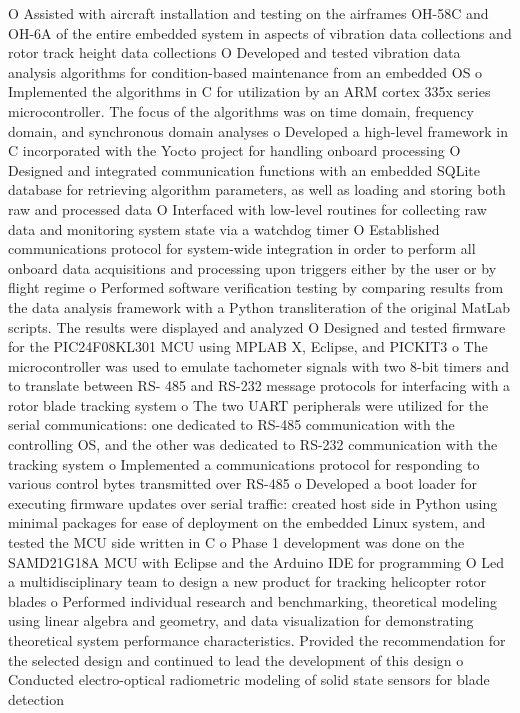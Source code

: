 \documentclass[a4paper]{article}
\begin{document}
\begin{itemize}
O Assisted with aircraft installation and testing on the airframes OH-58C and OH-6A of the entire embedded
system in aspects of vibration data collections and rotor track height data collections
O Developed and tested vibration data analysis algorithms for condition-based maintenance from an embedded OS
o Implemented the algorithms in C for utilization by an ARM cortex 335x series microcontroller. The focus of the
algorithms was on time domain, frequency domain, and synchronous domain analyses
o Developed a high-level framework in C incorporated with the Yocto project for handling onboard processing
O Designed and integrated communication functions with an embedded SQLite database for retrieving
algorithm parameters, as well as loading and storing both raw and processed data
O Interfaced with low-level routines for collecting raw data and monitoring system state via a watchdog timer
O Established communications protocol for system-wide integration in order to perform all onboard data
acquisitions and processing upon triggers either by the user or by flight regime
o Performed software verification testing by comparing results from the data analysis framework with a Python
transliteration of the original MatLab scripts. The results were displayed and analyzed
O Designed and tested firmware for the PIC24F08KL301 MCU using MPLAB X, Eclipse, and PICKIT3
o The microcontroller was used to emulate tachometer signals with two 8-bit timers and to translate between RS-
485 and RS-232 message protocols for interfacing with a rotor blade tracking system
o The two UART peripherals were utilized for the serial communications: one dedicated to RS-485 communication
with the controlling OS, and the other was dedicated to RS-232 communication with the tracking system
o Implemented a communications protocol for responding to various control bytes transmitted over RS-485
o Developed a boot loader for executing firmware updates over serial traffic: created host side in Python using
minimal packages for ease of deployment on the embedded Linux system, and tested the MCU side written in C
o Phase 1 development was done on the SAMD21G18A MCU with Eclipse and the Arduino IDE for programming
O Led a multidisciplinary team to design a new product for tracking helicopter rotor blades
o Performed individual research and benchmarking, theoretical modeling using linear algebra and geometry, and
data visualization for demonstrating theoretical system performance characteristics. Provided the
recommendation for the selected design and continued to lead the development of this design
o Conducted electro-optical radiometric modeling of solid state sensors for blade detection

\end{itemize}
\end{document}
